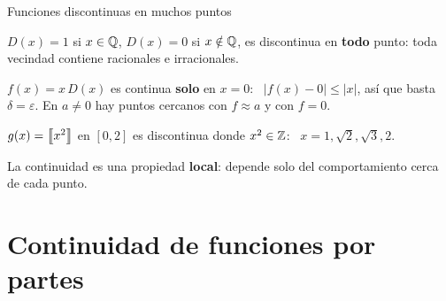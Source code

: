 \documentclass[10pt,aspectratio=169]{beamer}
\begin{document}
\begin{frame}{Funciones discontinuas en muchos puntos}
  \begin{ejemplo}[4: Dirichlet]
    $D(x)=1$ si $x\in\mathbb{Q}$, $D(x)=0$ si $x\notin\mathbb{Q}$, es discontinua en \textbf{todo} punto: toda vecindad contiene racionales e irracionales.
  \end{ejemplo}
  \begin{ejemplo}
    $f(x)=x\,D(x)$ es continua \textbf{solo} en $x=0$: \ $|f(x)-0|\le|x|$, así que basta $\delta=\varepsilon$. En $a\neq0$ hay puntos cercanos
    con $f\approx a$ y con $f=0$.
  \end{ejemplo}
  \begin{ejemplo}
    $g(x)=\left\llbracket x^2\right\rrbracket$ en $[0,2]$ es discontinua donde $x^2\in\mathbb{Z}$: \ $x=1,\sqrt2,\sqrt3,2$.
  \end{ejemplo}
  \begin{observacion}
    La continuidad es una propiedad \textbf{local}: depende solo del comportamiento cerca de cada punto.
  \end{observacion}
\end{frame}

\section{Continuidad de funciones por partes}
\end{document}
